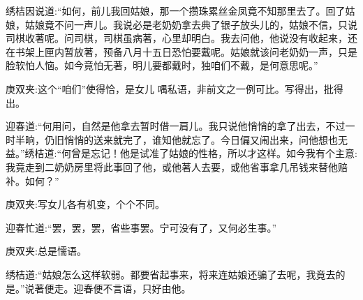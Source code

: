 \begin{parag}
    绣桔因说道:“如何，前儿我回姑娘，那一个攒珠累丝金凤竟不知那里去了。回了姑娘，姑娘竟不问一声儿。我说必是老奶奶拿去典了银子放头儿的，姑娘不信，只说司棋收著呢。问司棋，司棋虽病著，心里却明白。我去问他，他说没有收起来，还在书架上匣内暂放著，预备八月十五日恐怕要戴呢。姑娘就该问老奶奶一声，只是脸软怕人恼。如今竟怕无著，明儿要都戴时，独咱们不戴，是何意思呢。”\begin{note}庚双夹:这个“咱们”使得恰，是女儿 喁私语，非前文之一例可比。写得出，批得出。\end{note}迎春道:“何用问，自然是他拿去暂时借一肩儿。我只说他悄悄的拿了出去，不过一时半晌，仍旧悄悄的送来就完了，谁知他就忘了。今日偏又闹出来，问他想也无益。”绣桔道:“何曾是忘记！他是试准了姑娘的性格，所以才这样。如今我有个主意:我竟走到二奶奶房里将此事回了他，或他著人去要，或他省事拿几吊钱来替他赔补。如何？”\begin{note}庚双夹:写女儿各有机变，个个不同。\end{note}迎春忙道:“罢，罢，罢，省些事罢。宁可没有了，又何必生事。”\begin{note}庚双夹:总是懦语。\end{note}绣桔道:“姑娘怎么这样软弱。都要省起事来，将来连姑娘还骗了去呢，我竟去的是。”说著便走。迎春便不言语，只好由他。
\end{parag}


